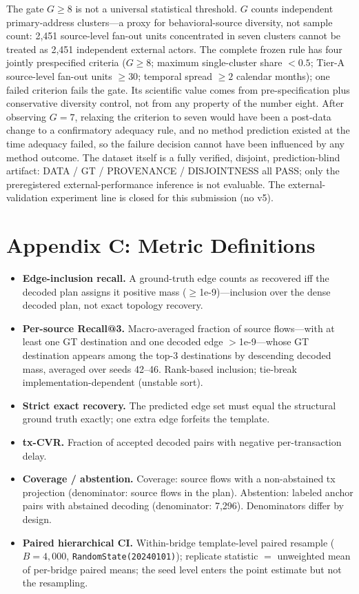 \documentclass[journal]{IEEEtran}
\begin{document}
The gate $G \ge 8$ is not a universal statistical threshold. $G$ counts independent primary-address clusters---a proxy for behavioral-source diversity, not sample count: 2{,}451 source-level fan-out units concentrated in seven clusters cannot be treated as 2{,}451 independent external actors. The complete frozen rule has four jointly prespecified criteria ($G \ge 8$; maximum single-cluster share $< 0.5$; Tier-A source-level fan-out units $\ge 30$; temporal spread $\ge 2$ calendar months); one failed criterion fails the gate. Its scientific value comes from pre-specification plus conservative diversity control, not from any property of the number eight. After observing $G = 7$, relaxing the criterion to seven would have been a post-data change to a confirmatory adequacy rule, and no method prediction existed at the time adequacy failed, so the failure decision cannot have been influenced by any method outcome. The dataset itself is a fully verified, disjoint, prediction-blind artifact: DATA / GT / PROVENANCE / DISJOINTNESS all PASS; only the preregistered external-performance inference is not evaluable. The external-validation experiment line is closed for this submission (no v5).

\section*{Appendix C: Metric Definitions}

\begin{itemize}
\item \textbf{Edge-inclusion recall.} A ground-truth edge counts as recovered iff the decoded plan assigns it positive mass ($\ge$1e-9)---inclusion over the dense decoded plan, not exact topology recovery.
\item \textbf{Per-source Recall@3.} Macro-averaged fraction of source flows---with at least one GT destination and one decoded edge $>$1e-9---whose GT destination appears among the top-3 destinations by descending decoded mass, averaged over seeds 42--46. Rank-based inclusion; tie-break implementation-dependent (unstable sort).
\item \textbf{Strict exact recovery.} The predicted edge set must equal the structural ground truth exactly; one extra edge forfeits the template.
\item \textbf{tx-CVR.} Fraction of accepted decoded pairs with negative per-transaction delay.
\item \textbf{Coverage / abstention.} Coverage: source flows with a non-abstained tx projection (denominator: source flows in the plan). Abstention: labeled anchor pairs with abstained decoding (denominator: 7{,}296). Denominators differ by design.
\item \textbf{Paired hierarchical CI.} Within-bridge template-level paired resample ($B=4{,}000$, \texttt{RandomState(20240101)}); replicate statistic $=$ unweighted mean of per-bridge paired means; the seed level enters the point estimate but not the resampling.
\end{itemize}
\end{document}
